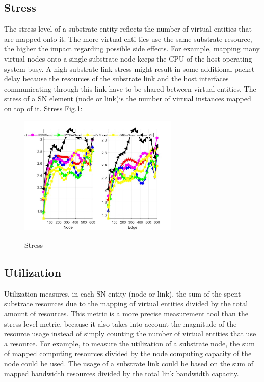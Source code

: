 \subsection{Stress}
The stress level of a substrate entity reflects the number of virtual entities that are mapped onto it. The more virtual enti ties use the same substrate resource, the higher the impact regarding possible side effects. For example, mapping many virtual nodes onto a single substrate node keeps the CPU of the host operating system busy. A high substrate link stress might result in some additional packet delay because the resources of the substrate link and the host interfaces communicating through this link have to be shared
between virtual entities.
The stress of a SN element (node or link)is the number of virtual instances mapped on top of it.
Stress Fig.\ref{fig:Stress}:
\begin{figure}
  \centering
  \includegraphics[width=3in]{Fig/Stress}\\
  \caption{Stress}\label{fig:Stress}
\end{figure}


\subsection{Utilization}
Utilization measures, in each SN entity (node or link), the sum of the spent substrate resources due to the mapping of virtual entities divided by the total amount of resources. This metric is a more precise measurement tool than
the stress level metric, because it also takes into account the magnitude of the resource usage instead of simply counting the number of virtual entities that use a resource. For example, to measure the utilization of a substrate node, the sum of mapped computing resources divided by the node computing capacity of the node could be used. The usage of a substrate link could be based on the sum of mapped bandwidth resources divided by the total link bandwidth capacity.

